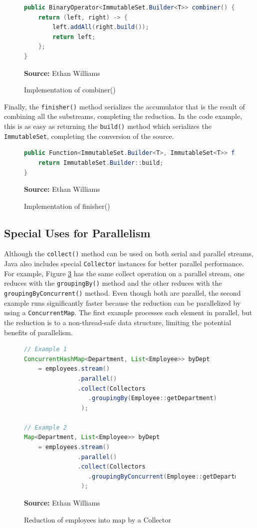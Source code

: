 \documentclass[oneside, 12pt]{article}
\newcommand{\source}[1]{\textbf{Source:} {#1} }
\begin{document}
\begin{figure}[H]
\centering
\begin{lstlisting}[language=Java]
public BinaryOperator<ImmutableSet.Builder<T>> combiner() {
    return (left, right) -> {
        left.addAll(right.build());
        return left;
    };
}
\end{lstlisting}
\caption{Implementation of combiner()}
\source{Ethan Williams}
\label{fig:combiner}
\end{figure}

Finally, the \verb|finisher()| method serializes the accumulator that is the result of combining all the substreams, completing the reduction. In the code example, this is as easy as returning the \verb|build()| method which serializes the \verb|ImmutableSet|, completing the conversion of the source.

\begin{figure}[H]
\centering
\begin{lstlisting}[language=Java]
public Function<ImmutableSet.Builder<T>, ImmutableSet<T>> finisher() {
    return ImmutableSet.Builder::build;
}
\end{lstlisting}
\caption{Implementation of finisher()}
\source{Ethan Williams}
\label{fig:finisher}
\end{figure}

\subsection{Special Uses for Parallelism}
Although the \verb|collect()| method can be used on both serial and parallel streams, Java also includes special \verb|Collector| instances for better parallel performance. For example, Figure \ref{fig:employee_collection} has the same collect operation on a parallel stream, one reduces with the \verb|groupingBy()| method and the other reduces with the \verb|groupingByConcurrent()| method. Even though both are parallel, the second example runs significantly faster because the reduction can be parallelized by using a \verb|ConcurrentMap|. The first example processes each element in parallel, but the reduction is to a non-thread-safe data structure, limiting the potential benefits of parallelism.

\begin{figure}[H]
\centering
\begin{lstlisting}[language=Java]
// Example 1
ConcurrentHashMap<Department, List<Employee>> byDept
    = employees.stream()
               .parallel()
               .collect(Collectors
                  .groupingBy(Employee::getDepartment)
                );
                
// Example 2
Map<Department, List<Employee>> byDept
    = employees.stream()
               .parallel()
               .collect(Collectors
                  .groupingByConcurrent(Employee::getDepartment)
                );
\end{lstlisting}
\caption{Reduction of employees into map by a Collector}
\source{Ethan Williams}
\label{fig:employee_collection}
\end{figure}
\end{document}

